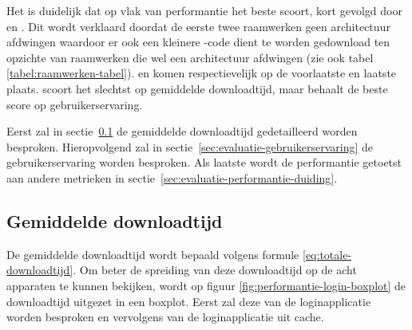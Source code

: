 Het is duidelijk dat op vlak van performantie \lungo{} het beste scoort, kort gevolgd door \jqm{} en \st{}.
Dit wordt verklaard doordat de eerste twee raamwerken geen architectuur afdwingen waardoor er ook een kleinere \js{}-code dient te worden gedownload ten opzichte van raamwerken die wel een architectuur afdwingen (zie ook tabel \ref{tabel:raamwerken-tabel}).
\kendo{} en \st{} komen respectievelijk op de voorlaatste en laatste plaats.
\st{} scoort het slechtst op gemiddelde downloadtijd, maar behaalt de beste score op gebruikerservaring.

Eerst zal in sectie~\ref{sec:evaluatie-downloadtijd} de gemiddelde downloadtijd gedetailleerd worden besproken.
Hieropvolgend zal in sectie~\ref{sec:evaluatie-gebruikerservaring} de gebruikerservaring worden besproken.
Als laatste wordt de performantie getoetst aan andere metrieken in sectie~\ref{sec:evaluatie-performantie-duiding}.



\subsection{Gemiddelde downloadtijd}
\label{sec:evaluatie-downloadtijd}

De gemiddelde downloadtijd wordt bepaald volgens formule \ref{eq:totale-downloadtijd}.
Om beter de spreiding van deze downloadtijd op de acht apparaten te kunnen bekijken, wordt op figuur \ref{fig:performantie-login-boxplot} de downloadtijd uitgezet in een boxplot.
Eerst zal deze van de loginapplicatie worden besproken en vervolgens van de loginapplicatie uit cache.


